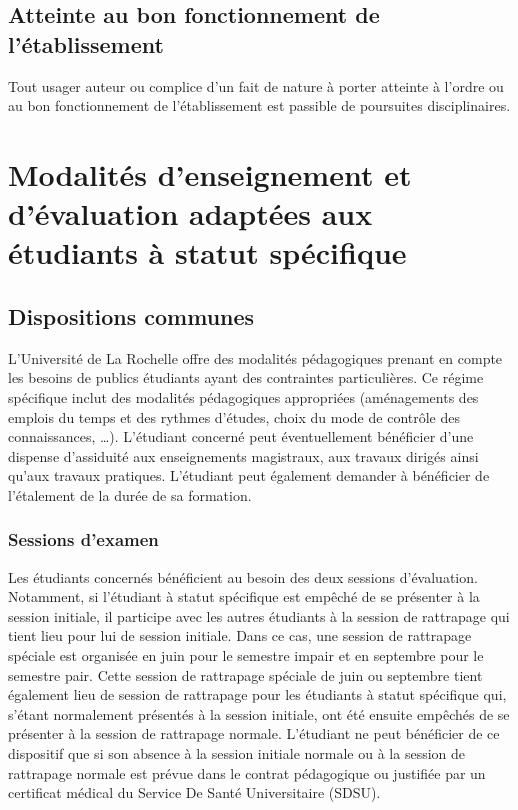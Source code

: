 \documentclass[a4paper,11pt]{article}
\begin{document}
\subsection{Atteinte au bon fonctionnement de l'établissement}
Tout usager auteur ou complice d'un fait de nature à porter atteinte à l'ordre ou au bon fonctionnement de l'établissement est passible de poursuites disciplinaires.

\section{Modalités d'enseignement et d'évaluation adaptées aux étudiants à statut spécifique}\label{StatutSpe}
\subsection{Dispositions communes}\label{Communes}
L'Université de La Rochelle offre des modalités pédagogiques prenant en compte les besoins de publics étudiants ayant des contraintes particulières.
Ce régime spécifique inclut des modalités pédagogiques appropriées (aménagements des emplois du temps et des rythmes d'études, choix du mode de contrôle des connaissances, \ldots{}). L'étudiant concerné peut éventuellement bénéficier d'une dispense d'assiduité aux enseignements magistraux, aux travaux dirigés ainsi qu'aux travaux pratiques. L'étudiant peut également demander à bénéficier de l'étalement de la durée de sa formation.

\subsubsection{Sessions d'examen}\label{DispoExam}
Les étudiants concernés bénéficient au besoin des deux sessions d'évaluation. Notamment, si l'étudiant à statut spécifique est empêché de se présenter à la session initiale, il participe avec les autres étudiants à la session de rattrapage qui tient lieu pour lui de session initiale. Dans ce cas, une session de rattrapage spéciale est organisée en juin pour le semestre impair et en septembre pour le semestre pair.
Cette session de rattrapage spéciale de juin ou septembre tient également lieu de session de rattrapage pour les étudiants à statut spécifique qui, s'étant normalement présentés à la session initiale, ont été ensuite empêchés de se présenter à la session de rattrapage normale.
L'étudiant ne peut bénéficier de ce dispositif que si son absence à la session initiale normale ou à la session de rattrapage normale est prévue dans le contrat pédagogique ou justifiée par un certificat médical du Service De Santé Universitaire (SDSU).
\end{document}
